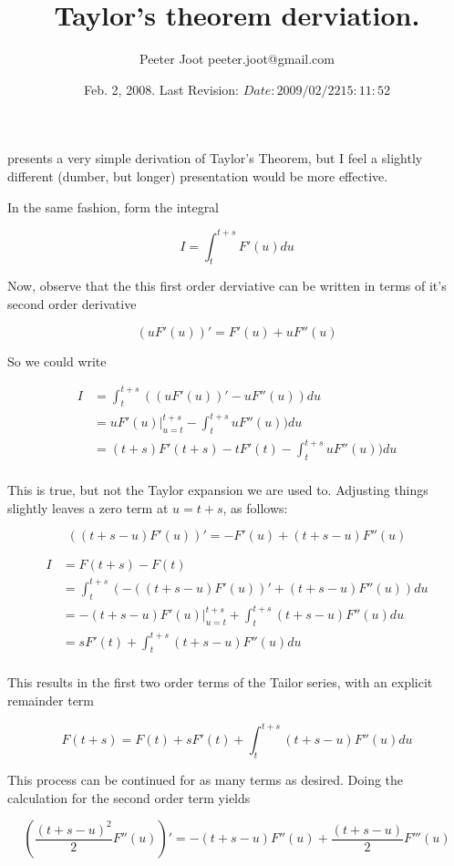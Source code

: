 \documentclass{article}
\title{Taylor's theorem derviation.}
\author{Peeter Joot \quad peeter.joot@gmail.com}
\date{ Feb. 2, 2008. Last Revision: $Date: 2009/02/22 15:11:52 $ } %
\begin{document}
\maketitle{}

\cite{hestenes1999nfc} presents a very simple derivation of Taylor's Theorem,
but I feel a
slightly different (dumber, but longer) presentation would be more effective.

In the same fashion, form the integral

\[
I = \int_{t}^{t+s} F'(u) du
\]

Now, observe that the this first order derviative can be written in
terms of it's second order derivative

\[
(u F'(u))' = F'(u) + u F''(u)
\]

So we could write

\begin{align*}
I &= \int_{t}^{t+s} ((u F'(u))' - u F''(u)) du \\
  &= {u F'(u)} \vert_{u=t}^{t+s} - \int_{t}^{t+s} u F''(u)) du \\
  &= (t+s) F'(t+s) - t F'(t) - \int_{t}^{t+s} u F''(u)) du \\
\end{align*}

This is true, but not the Taylor expansion we are used to.  Adjusting things slightly leaves a zero term at $u=t+s$, as follows:

\[
\left((t + s - u) F'(u)\right)' = -F'(u) + (t+s-u) F''(u)
\]

\begin{align*}
I &= F(t+s) - F(t) \\
 &= \int_{t}^{t+s} ( - ((t + s - u) F'(u))' + (t+s-u) F''(u) ) du \\
 &= - {(t + s - u) F'(u)} \vert_{u=t}^{t+s} + \int_{t}^{t+s} (t+s-u) F''(u) du \\
 &= s F'(t) + \int_{t}^{t+s} (t+s-u) F''(u) du \\
\end{align*}

This results in the first two order terms of the Tailor series, with an explicit remainder term

\[
F(t+s) = F(t) + s F'(t) + \int_{t}^{t+s} (t+s-u) F''(u) du
\]

This process can be continued for as many terms as desired.  Doing the calculation for the second order term yields

\[
\left(\frac{(t + s - u)^2}{2} F''(u)\right)' = -( t + s - u ) F''(u) + \frac{(t+s-u)}{2} F'''(u)
\]
\end{document}
